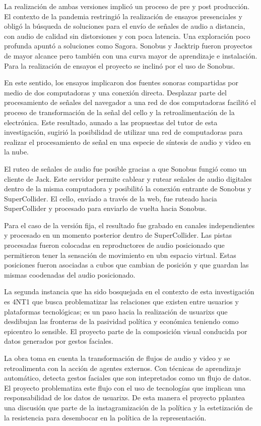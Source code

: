 La realización de ambas versiones implicó un proceso de pre y post producción. El contexto de la pandemia restringió la realización de ensayos presenciales y obligó la búsqueda de soluciones para el envío de señales de audio a distancia, con audio de calidad sin distorsiones y con poca latencia. Una exploración poco profunda apuntó a soluciones como Sagora. Sonobus y Jacktrip fueron proyectos de mayor alcance pero también con una curva mayor de aprendizaje e instalación. Para la realización de ensayos el proyecto se inclinó por el uso de Sonobus.

En este sentido, los ensayos implicaron dos fuentes sonoras compartidas por medio de dos computadoras y una conexión directa. Desplazar parte del procesamiento de señales del navegador a una red de dos computadoras facilitó el proceso de transformación de la señal del cello y la retroalimentación de la electrónica. Este resultado, aunado a las propuestas del tutor de esta investigación, sugirió la posibilidad de utilizar una red de computadoras para realizar el procesamiento de señal en una especie de síntesis de audio y video en la nube. 

El ruteo de señales de audio fue posible gracias a que Sonobus fungió como un cliente de Jack. Este servidor permite cablear y rutear señales de audio digitales dentro de la misma computadora y posibilitó la conexión entrante de Sonobus y SuperCollider. El cello, envíado a través de la web, fue ruteado hacia SuperCollider y procesado para enviarlo de vuelta hacia Sonobus.

Para el caso de la versión fija, el resultado fue grabado en canales independientes y procesado en un momento posterior dentro de SuperCollider. Las pistas procesadas fueron colocadas en reproductores de audio posicionado que permitieron tener la sensación de movimiento en ubn espacio virtual. Estas posiciones fueron asociadas a cubos que cambian de posición y que guardan las mismas coodenadas del audio posicionado. 

La segunda instancia que ha sido bosquejada en el contexto de esta investigación es 4NT1 que busca problematizar las relaciones que existen entre usuarios y plataformas tecnológicas; es un paso hacia la realización de usuarixs que desdibujan las fronteras de la pasividad política y económica teniendo como epicentro lo sensible. El proyecto parte de la composición visual conducida por datos generados por gestos faciales. 

La obra toma en cuenta la transformación de flujos de audio y video y se retroalimenta con la acción de agentes externos. Con técnicas de aprendizaje automático, detecta gestos faciales que son intepretados como un flujo de datos. El proyecto problematiza este flujo con el uso de tecnologías que implican una responsabilidad de los datos de usuarixs. De esta manera el proyecto pplantea una discusión que parte de la instagramización de la política y la estetización de la resistencia para desembocar en la política de la representación.

